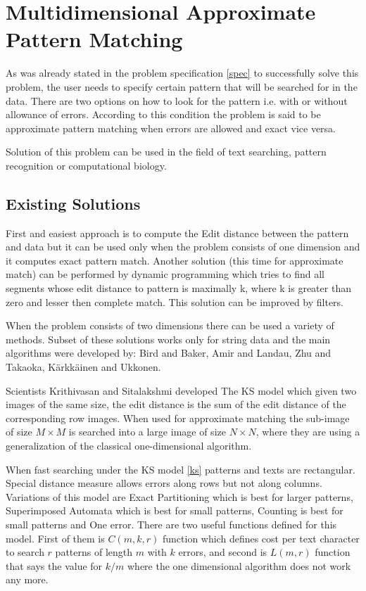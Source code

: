 \chapter{Multidimensional Approximate Pattern Matching}\label{multidimApprPattMatch}
As was already stated in the problem specification \ref{spec} to successfully solve this problem, the user needs to specify certain pattern that will be searched for in the data. There are two options on how to look for the pattern i.e. with or without allowance of errors. According to this condition the problem is said to be approximate pattern matching when errors are allowed and exact vice versa.

Solution of this problem can be used in the field of text searching, pattern recognition or computational biology.

\section{Existing Solutions}

First and easiest approach is to compute the Edit distance between the pattern and data but it can be used only when the problem consists of one dimension and it computes exact pattern match. Another solution (this time for approximate match) can be performed by dynamic programming which tries to find all segments whose edit distance to pattern is maximally k, where k is greater than zero and lesser then complete match. This solution can be improved by filters.

When the problem consists of two dimensions there can be used a variety of methods. Subset of these solutions works only for string data and the main algorithms were developed by: Bird and Baker, Amir and Landau, Zhu and Takaoka, K{\"a}rkk{\"a}inen and Ukkonen.

Scientists Krithivasan and Sitalakshmi developed The KS model which given two images of the same size, the edit distance is the sum of the edit distance of the corresponding row images. When used for approximate matching the sub-image of size $M\times M$ is searched into a large image of size $N\times N$, where they are using a generalization of the classical one-dimensional algorithm.

When fast searching under the KS model \ref{ks} patterns and texts are rectangular. Special distance measure allows errors along rows but not along columns. Variations of this model are Exact Partitioning which is best for larger patterns, Superimposed Automata which is best for small patterns, Counting is best for small patterns and One error. There are two useful functions defined for this model. First of them is $C(m,k,r)$ function which defines cost per text character to search $r$ patterns of length $m$ with $k$ errors, and second is $L(m,r)$ function that says the value for $k/m$ where the one dimensional algorithm does not work any more.

